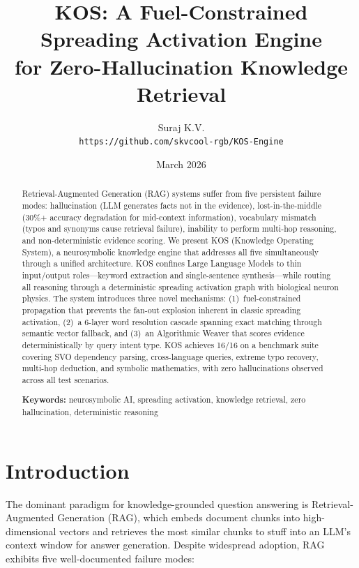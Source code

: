 \documentclass[11pt,a4paper]{article}
\title{KOS: A Fuel-Constrained Spreading Activation Engine\\for Zero-Hallucination Knowledge Retrieval}
\author{Suraj K.V.\\
\texttt{https://github.com/skvcool-rgb/KOS-Engine}}
\date{March 2026}
\begin{document}
\maketitle

\begin{abstract}
Retrieval-Augmented Generation (RAG) systems suffer from five persistent failure modes: hallucination (LLM generates facts not in the evidence), lost-in-the-middle (30\%+ accuracy degradation for mid-context information), vocabulary mismatch (typos and synonyms cause retrieval failure), inability to perform multi-hop reasoning, and non-deterministic evidence scoring. We present KOS (Knowledge Operating System), a neurosymbolic knowledge engine that addresses all five simultaneously through a unified architecture. KOS confines Large Language Models to thin input/output roles---keyword extraction and single-sentence synthesis---while routing all reasoning through a deterministic spreading activation graph with biological neuron physics. The system introduces three novel mechanisms: (1)~fuel-constrained propagation that prevents the fan-out explosion inherent in classic spreading activation, (2)~a 6-layer word resolution cascade spanning exact matching through semantic vector fallback, and (3)~an Algorithmic Weaver that scores evidence deterministically by query intent type. KOS achieves 16/16 on a benchmark suite covering SVO dependency parsing, cross-language queries, extreme typo recovery, multi-hop deduction, and symbolic mathematics, with zero hallucinations observed across all test scenarios.

\medskip
\noindent\textbf{Keywords:} neurosymbolic AI, spreading activation, knowledge retrieval, zero hallucination, deterministic reasoning
\end{abstract}

\section{Introduction}

The dominant paradigm for knowledge-grounded question answering is Retrieval-Augmented Generation (RAG), which embeds document chunks into high-dimensional vectors and retrieves the most similar chunks to stuff into an LLM's context window for answer generation. Despite widespread adoption, RAG exhibits five well-documented failure modes:
\end{document}
